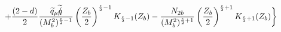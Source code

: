 \begin{equation}
+\frac{(2-d)}{2}\frac{\widetilde{q}_{\mu}\widetilde{q\hspace{-0.20cm}/}}
{(M^{2}_{b})^{\frac{\epsilon}{2}-1}}\left(\frac{Z_{b}}{2}\right)^{\frac{\epsilon}{2}-1}K_{\frac{\epsilon}{2}-1}(Z_{b})
-\frac{{N_{2b}}}{(M^{2}_{b})^{\frac{\epsilon}{2}+1}}
\left(\frac{Z_{b}}{2}\right)^{\frac{\epsilon}{2}+1}K_{\frac{\epsilon}{2}+1}(Z_{b})\biggr\}
\end{equation}\
